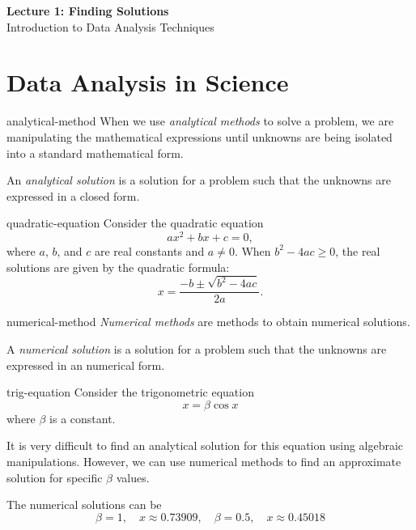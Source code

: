 \documentclass[12pt]{article}
\numberwithin{figure}{section}
\begin{document}
\begin{center}
  {\LARGE\bfseries Lecture 1: Finding Solutions}\\[0.25em]
  {\large Introduction to Data Analysis Techniques}\\[0.15em]
\end{center}

\section{Data Analysis in Science} 

\begin{dfn}{analytical-method}
  When we use \emph{analytical methods} to solve a problem, we are manipulating the mathematical expressions until unknowns are being isolated into a standard mathematical form. 

  An \emph{analytical solution} is a solution for a problem such that the unknowns are expressed in a closed form. 
\end{dfn}

\begin{eg}{quadratic-equation}
  Consider the quadratic equation
  \begin{equation}
    ax^2 + bx + c = 0,
  \end{equation}
  where $a$, $b$, and $c$ are real constants and $a\ne0$.
  When $b^2-4ac\geq0$, the real solutions are given by the quadratic formula:
  \begin{equation}
    x = \frac{-b \pm \sqrt{b^2 - 4ac}}{2a}.
  \end{equation} 
\end{eg}

\begin{dfn}{numerical-method}
  \emph{Numerical methods} are methods to obtain numerical solutions. 

  A \emph{numerical solution} is a solution for a problem such that the unknowns are expressed in an numerical form.
\end{dfn} 

\begin{eg}{trig-equation}
  Consider the trigonometric equation
  \begin{equation}
    x = \beta \cos x
  \end{equation} 
  where $\beta$ is a constant. 

  It is very difficult to find an analytical solution for this equation using algebraic manipulations. However, we can use numerical methods to find an approximate solution for specific $\beta$ values. 

  The numerical solutions can be 
  \[
  \beta = 1, \quad x \approx 0.73909, \quad \beta = 0.5, \quad x \approx 0.45018
  \]
\end{eg} 
\end{document}
